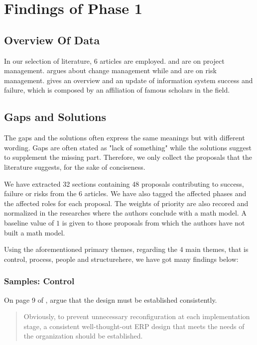 
\section{Findings of Phase 1}

\subsection{Overview Of Data}
In our selection of literature, 6 articles are employed.  and  are on project management.  argues about change management while  and  are on risk management.  gives an overview and an update of information system success and failure, which is composed by an affiliation of famous scholars in the field.

\subsection{Gaps and Solutions}

The gaps and the solutions often express the same meanings but with different wording. Gaps are often stated as "lack of something" while the solutions suggest to supplement the missing part. Therefore, we only collect the proposals that the literature suggests, for the sake of conciseness.

We have extracted 32 sections containing 48 proposals contributing to success, failure or risks from the 6 articles. We have also tagged the affected phases and the affected roles for each proposal. The weights of priority are also recored and normalized in the researches where the authors conclude with a math model. A baseline value of $1$ is given to those proposals from which the authors have not built a math model.

Using the aforementioned primary themes, regarding the 4 main themes, that is control, process, people and structurehere, we have got many findings below:

\subsubsection{Samples: Control}

On page 9 of , \citeauthor{3} argue that the design must be established consistently.

\begin{quotation}
Obviously, to prevent unnecessary reconfiguration at each implementation stage, a consistent well-thought-out ERP design that meets the needs of the organization should be established.
\end{quotation}

